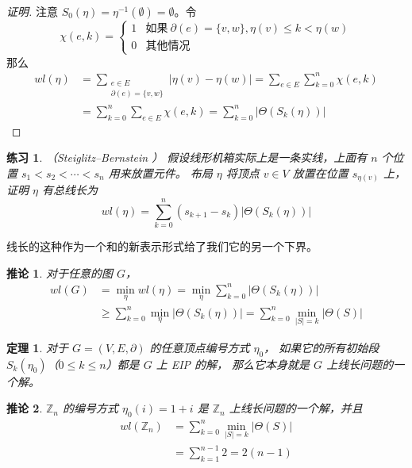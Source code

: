 \documentclass[12pt, a4paper]{article}
\newtheorem{theorem}{定理}
\newtheorem{corollary}{推论}
\newtheorem{exercise}{练习}
\begin{document}
\begin{proof}[证明]
注意 $S_0(\eta) = \eta^{−1}(\emptyset) = \emptyset$。令
\begin{equation*}
\chi(e, k) = \begin{cases}
	1 & \text{如果}\ \partial(e) = \{v, w\}, \eta(v) \le k < \eta(w) \\
	0 & \text{其他情况}
\end{cases}
\end{equation*}
那么
\begin{align*}
wl(\eta)
& = \sum_{\substack{
	e \in E \\
	\partial(e) = \{v, w\}
}} |\eta(v) - \eta(w)| = \sum_{e \in E} \sum_{k = 0}^n \chi(e, k) \\
& = \sum_{k = 0}^n \sum_{e \in E} \chi(e, k) = \sum_{k = 0}^n |\Theta(S_k(\eta))|
\end{align*}
\end{proof}

\begin{exercise}
\label{Exercise 11}
（Steiglitz–Bernstein \cite{Steiglitz.1965}）
假设线形机箱实际上是一条实线，上面有 $n$ 个位置 $s_1 < s_2 < \cdots < s_n$ 用来放置元件。
布局 $\eta$ 将顶点 $v \in V$ 放置在位置 $s_{\eta(v)}$ 上，证明 $\eta$ 有总线长为
\begin{equation*}
wl(\eta) = \sum_{k = 0}^n (s_{k + 1} - s_k) |\Theta(S_k(\eta))|
\end{equation*}
\end{exercise}

线长的这种作为一个和的新表示形式给了我们它的另一个下界。

\begin{corollary}
\label{Corollary 2}
对于任意的图 $G$，
\begin{align*}
wl(G)
& = \min_{\eta} wl(\eta) = \min_{\eta} \sum_{k = 0}^n |\Theta(S_k(\eta))| \\
& \ge \sum_{k = 0}^n \min_{\eta} |\Theta(S_k(\eta))| = \sum_{k = 0}^n \min_{|S| = k} |\Theta(S)|
\end{align*}
\end{corollary}

\begin{theorem}
\label{Theorem 2}
对于 $G = (V, E, \partial)$ 的任意顶点编号方式 $\eta_0$，
如果它的所有初始段 $S_k(\eta_0)$（$0 \le k \le n$）都是 $G$ 上 EIP 的解，
那么它本身就是 $G$ 上线长问题的一个解。
\end{theorem}

\begin{corollary}
\label{Corollary 3}
$\mathbb{Z}_n$ 的编号方式 $\eta_0(i) = 1 + i$ 是 $\mathbb{Z}_n$ 上线长问题的一个解，并且
\begin{align*}
wl(\mathbb{Z}_n) & = \sum_{k = 0}^n \min_{|S| = k} |\Theta(S)| \\
		 & = \sum_{k = 1}^{n - 1} 2 = 2 (n - 1)
\end{align*}
\end{corollary}
\end{document}
